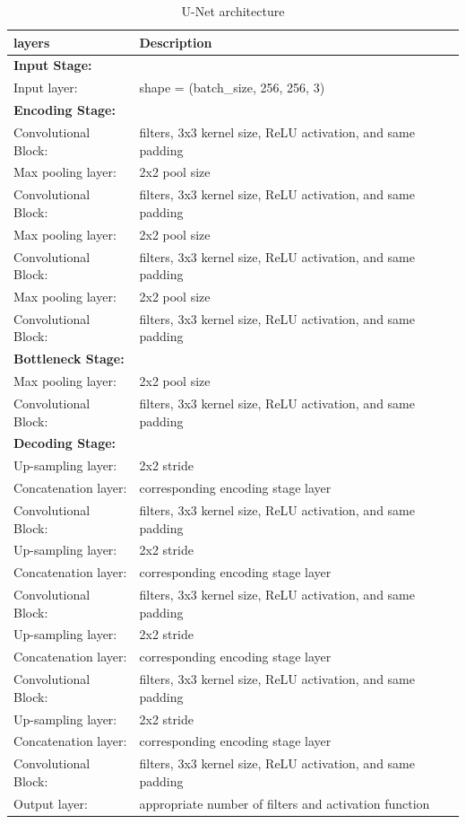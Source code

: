 \documentclass[12pt,oneside,openright,a4paper]{cpe-thai-project}
\begin{document}
\begin{itemize}
\begin{table}[!h]
\centering
\caption{U-Net architecture}\label{tbl:U-Netarchitech}
\begin{tabular}{p{}>{\raggedright\arraybackslash}p{}}
\toprule
layers  & Description  \\ \midrule
\textbf{Input Stage:} & \\
\quad Input layer: & shape = (batch\_size, 256, 256, 3) \\ 
\textbf{Encoding Stage:} & \\

\quad Convolutional Block: & 64 filters, 3x3 kernel size, ReLU activation, and same padding \\
\quad Max pooling layer: & 2x2 pool size \\
\quad Convolutional Block: & 128 filters, 3x3 kernel size, ReLU activation, and same padding \\
\quad Max pooling layer: & 2x2 pool size \\
\quad Convolutional Block: & 256 filters, 3x3 kernel size, ReLU activation, and same padding \\
\quad Max pooling layer: & 2x2 pool size \\
\quad Convolutional Block: & 512 filters, 3x3 kernel size, ReLU activation, and same padding \\
\textbf{Bottleneck Stage:} & \\
\quad Max pooling layer: & 2x2 pool size \\
\quad Convolutional Block: & 1024 filters, 3x3 kernel size, ReLU activation, and same padding \\
\textbf{Decoding Stage:} & \\
\quad Up-sampling layer: & 2x2 stride \\
\quad Concatenation layer: & corresponding encoding stage layer \\
\quad Convolutional Block: & 512 filters, 3x3 kernel size, ReLU activation, and same padding \\
\quad Up-sampling layer: & 2x2 stride \\
\quad Concatenation layer: & corresponding encoding stage layer \\
\quad Convolutional Block: & 256 filters, 3x3 kernel size, ReLU activation, and same padding \\
\quad Up-sampling layer: & 2x2 stride \\
\quad Concatenation layer: & corresponding encoding stage layer \\
\quad Convolutional Block: & 128 filters, 3x3 kernel size, ReLU activation, and same padding \\
\quad Up-sampling layer: & 2x2 stride \\
\quad Concatenation layer: & corresponding encoding stage layer \\
\quad Convolutional Block: & 64 filters, 3x3 kernel size, ReLU activation, and same padding \\
\quad Output layer: & appropriate number of filters and activation function \\


\end{tabular}
\end{table}
\end{itemize}
\end{document}
